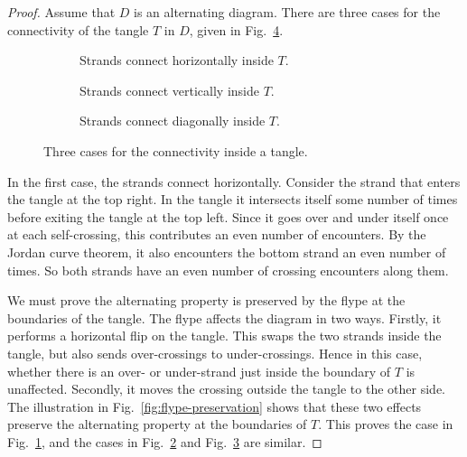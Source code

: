 \documentclass[12pt]{report}
\theoremstyle{upright}
\begin{document}
\begin{proof}
Assume that $D$ is an alternating diagram. There are three cases for the connectivity of the tangle $T$ in $D$, given in Fig.~\ref{fig:flype-connect}.

\begin{figure}[H]
	\centering
	\hspace*{\fill}
	\begin{subfigure}[b]{0.3 \textwidth}
		\centering
		\def\svgscale{0.55}
		
		\caption{Strands connect horizontally inside $T$.}
		\label{fig:flype-connect-horizon}
	\end{subfigure}
	\hspace*{\fill}
	\begin{subfigure}[b]{0.3 \textwidth}
		\centering
		\def\svgscale{0.55}
		
		\caption{Strands connect vertically inside $T$.}
		\label{fig:flype-connect-vert}
	\end{subfigure}
	\hspace*{\fill}
	\begin{subfigure}[b]{0.3 \textwidth}
		\centering
		\def\svgscale{0.55}
		
		\caption{Strands connect diagonally inside $T$.}
		\label{fig:flype-connect-diag}
	\end{subfigure}
	\hspace*{\fill}
	\caption{Three cases for the connectivity inside a tangle.}
	\label{fig:flype-connect}
\end{figure}

In the first case, the strands connect horizontally. Consider the strand that enters the tangle at the top right. In the tangle it intersects itself some number of times before exiting the tangle at the top left. Since it goes over and under itself once at each self-crossing, this contributes an even number of encounters.  By the Jordan curve theorem, it also encounters the bottom strand an even number of times. So both strands have an even number of crossing encounters along them.

We must prove the alternating property is preserved by the flype at the boundaries of the tangle. The flype affects the diagram in two ways. Firstly, it performs a horizontal flip on the tangle. This swaps the two strands inside the tangle, but also sends over-crossings to under-crossings. Hence in this case, whether there is an over- or under-strand just inside the boundary of $T$ is unaffected. Secondly, it moves the crossing outside the tangle to the other side. The illustration in Fig.~\ref{fig:flype-preservation} shows that these two effects preserve the alternating property at the boundaries of $T$. This proves the case in Fig.~\ref{fig:flype-connect-horizon}, and the cases in Fig.~\ref{fig:flype-connect-vert} and Fig.~\ref{fig:flype-connect-diag} are similar.
\end{proof}
\end{document}
